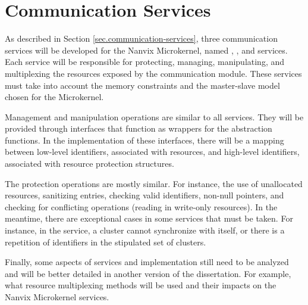	\section{Communication Services}

		As described in Section \ref{sec.communication-services}, three communication
		services will be developed for the Nanvix Microkernel, named \sync, \mailbox,
		and \portal services.
		Each service will be responsible for protecting, managing, manipulating,
		and multiplexing the resources exposed by the \hal communication module.
		These services must take into account the memory constraints and the
		master-slave model chosen for the Microkernel.

		Management and manipulation operations are similar to all services.
		They will be provided through interfaces that function as wrappers
		for the \hal abstraction functions.
		In the implementation of these interfaces, there will be a mapping
		between low-level identifiers, associated with \hal resources,
		and high-level identifiers, associated with resource protection structures.

		The protection operations are mostly similar.
		For instance, the use of unallocated resources, sanitizing entries,
		checking valid identifiers, non-null pointers, and checking
		for conflicting operations (reading in write-only resources).
		In the meantime, there are exceptional cases in some services
		that must be taken.
		For instance, in the \sync service, a cluster cannot synchronize
		with itself, or there is a repetition of identifiers in the
		stipulated set of clusters.

		Finally, some aspects of services and implementation still need
		to be analyzed and will be better detailed in another version
		of the dissertation.
		For example, what resource multiplexing methods will be used
		and their impacts on the Nanvix Microkernel services.
